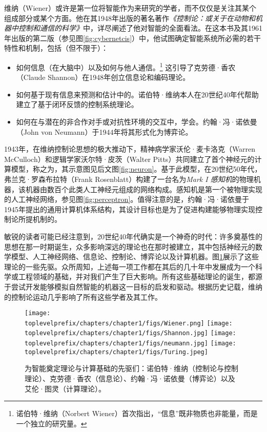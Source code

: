 \documentclass[../../book-main.tex]{subfiles}
\begin{document}
维纳（Wiener）或许是第一位将智能作为{}来研究的学者，而不仅仅是关注其某个组成部分或某个方面。他在其1948年出版的著名著作{\em《控制论：或关于在动物和机器中控制和通信的科学》}\cite{Wiener-Cybernetics-1948}中，详尽阐述了他对智能的全面看法。在这本书及其1961年出版的第二版\cite{Wiener-Cybernetics-1961}（参见图\ref{fig:cybernetcis}）中，他试图确定智能系统所必需的若干特性和机制，包括（但不限于）：
\begin{itemize}
    \item 如何{}信息（在大脑中）以及如何与他人通信。\footnote{诺伯特·维纳（Norbert Wiener）首次指出，“信息”既非物质也非能量，而是一个独立的研究量。} 这引导了克劳德·香农（Claude Shannon）在1948年创立信息论和编码理论。
    \item 如何基于现有信息来{}预测和估计中的{}。诺伯特·维纳本人在20世纪40年代帮助建立了基于闭环反馈的控制系统理论。
    \item 如何在与潜在的非合作对手或对抗性环境的交互中，学会{}。约翰·冯·诺依曼（John von Neumann）于1944年将其形式化为博弈论。
\end{itemize}
1943年，在维纳控制论思想的极大推动下，精神病学家沃伦·麦卡洛克（Warren McCulloch）和逻辑学家沃尔特·皮茨（Walter Pitts）共同建立了首个神经元的计算模型\cite{McCulloch-Pitts}，称之为{}，其示意图见后文图\ref{fig:neuron}。基于此模型，在20世纪50年代，弗兰克·罗森布拉特（Frank Rosenblatt）构建了一台名为{\em Mark I 感知机}的物理机器，该机器由数百个此类人工神经元组成的网络构成。感知机是第一个被物理实现的人工神经网络，参见图\ref{fig:perceptron}。值得注意的是，约翰·冯·诺依曼于1945年提出的通用计算机体系结构，其设计目标也是为了促进构建能够物理实现控制论所提机制的{}。

敏锐的读者可能已经注意到，20世纪40年代确实是一个神奇的时代：许多奠基性的思想在那一时期诞生，众多影响深远的理论也在那时被建立，其中包括神经元的数学模型、人工神经网络、信息论、控制论、博弈论以及计算机器。图\ref{fig:god-fathers}展示了这些理论的一些先驱。众所周知，上述每一项工作都在其后的几十年中发展成为一个科学或工程领域的基础，并对我们产生了巨大影响。所有这些基础理论的诞生，都源于尝试开发能够模拟自然智能的机器这一目标的启发和驱动。根据历史记载，维纳的控制论运动几乎影响了所有这些学者及其工作。
\begin{figure}
    \centering
    \texttt{[image: \\toplevelprefix/chapters/chapter1/figs/Wiener.png]}
    \texttt{[image: \\toplevelprefix/chapters/chapter1/figs/Shannon.jpg]}
    \texttt{[image: \\toplevelprefix/chapters/chapter1/figs/neumann.jpg]}
    \texttt{[image: \\toplevelprefix/chapters/chapter1/figs/Turing.jpeg]}
    \caption{为智能奠定理论与计算基础的先驱们：诺伯特·维纳（控制论与控制理论）、克劳德·香农（信息论）、约翰·冯·诺依曼（博弈论）以及艾伦·图灵（计算理论）。}
    \label{fig:god-fathers}
\end{figure}
\end{document}
